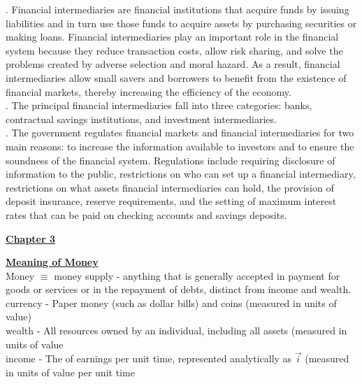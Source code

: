 \documentclass[12pt]{article}
\begin{document}
. Financial intermediaries are financial institutions that acquire funds by issuing liabilities and in turn use those funds to acquire assets by 
purchasing securities or making loans. Financial intermediaries play an important role in the financial system because they reduce transaction costs, 
allow risk sharing, and solve the problems created by adverse selection and moral hazard. As a result, financial intermediaries allow small savers and 
borrowers to benefit from the existence of financial markets, thereby increasing the efficiency of the economy.\\

. The principal financial intermediaries fall into three categories: banks, contractual savings institutions, and investment intermediaries.\\

. The government regulates financial markets and financial intermediaries for two main reasons: to increase the information available to investors 
and to ensure the soundness of the financial system. Regulations include requiring disclosure of information to the public, restrictions on 
who can set up a financial intermediary, restrictions on what assets financial intermediaries can hold, the provision of deposit insurance, 
reserve requirements, and the setting of maximum interest rates that can be paid on checking accounts and savings deposits.\\

\newpage

\begin{center}
\underline{\bf \huge Chapter 3}
\end{center}

\noindent \underline{\bf Meaning of Money}\\

\noindent Money $\equiv$ money supply - anything that is generally accepted in payment for goods or services or in the repayment of debts, distinct from income and wealth. \\

\noindent currency - Paper money (such as dollar bills) and coins (measured in units of value)\\

\noindent wealth - All resources owned by an individual, including all assets (measured in units of value\\

\noindent income - The of earnings per unit time, represented analytically as $\vec i$ (measured in units of value per unit time\\
\end{document}
